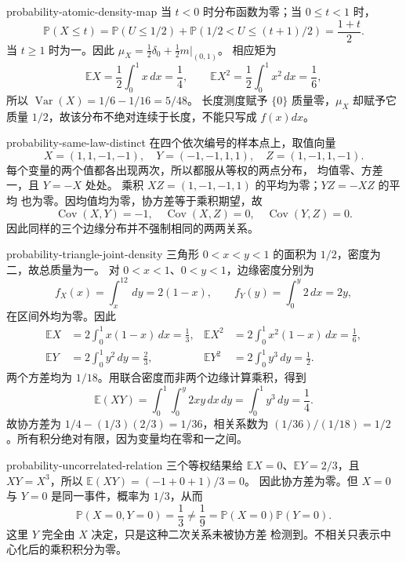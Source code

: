 \begin{solution}{probability-atomic-density-map}
当 \(t<0\) 时分布函数为零；当 \(0\le t<1\) 时，
\[
 \mathbb P(X\le t)=\mathbb P(U\le1/2)
       +\mathbb P(1/2<U\le(t+1)/2)=\frac{1+t}{2}.
\]
当 \(t\ge1\) 时为一。因此
\(\mu_X=\tfrac12\delta_0+\tfrac12m|_{(0,1)}\)。
相应矩为
\[
 \mathbb E X=\frac12\int_0^1x\,dx=\frac14,
 \qquad\mathbb E X^2=\frac12\int_0^1x^2\,dx=\frac16,
\]
所以 \(\operatorname{Var}(X)=1/6-1/16=5/48\)。
长度测度赋予 \(\{0\}\) 质量零，\(\mu_X\) 却赋予它质量
\(1/2\)，故该分布不绝对连续于长度，不能只写成 \(f(x)dx\)。
\end{solution}

\begin{solution}{probability-same-law-distinct}
在四个依次编号的样本点上，取值向量
\[
 X=(1,1,-1,-1),\quad Y=(-1,-1,1,1),\quad Z=(1,-1,1,-1).
\]
每个变量的两个值都各出现两次，所以都服从等权的两点分布，
均值零、方差一，且 \(Y=-X\) 处处。
乘积 \(XZ=(1,-1,-1,1)\) 的平均为零；\(YZ=-XZ\) 的平均
也为零。因均值均为零，协方差等于乘积期望，故
\[
 \operatorname{Cov}(X,Y)=-1,\quad
 \operatorname{Cov}(X,Z)=0,\quad
 \operatorname{Cov}(Y,Z)=0.
\]
因此同样的三个边缘分布并不强制相同的两两关系。
\end{solution}

\begin{solution}{probability-triangle-joint-density}
三角形 \(0<x<y<1\) 的面积为 \(1/2\)，密度为二，故总质量为一。
对 \(0<x<1\)、\(0<y<1\)，边缘密度分别为
\[
 f_X(x)=\int_x^12\,dy=2(1-x),\qquad
 f_Y(y)=\int_0^y2\,dx=2y,
\]
在区间外均为零。因此
\[
 \begin{aligned}
 \mathbb E X&=2\int_0^1x(1-x)\,dx=\frac13,&
 \mathbb E X^2&=2\int_0^1x^2(1-x)\,dx=\frac16,\\
 \mathbb E Y&=2\int_0^1y^2\,dy=\frac23,&
 \mathbb E Y^2&=2\int_0^1y^3\,dy=\frac12.
 \end{aligned}
\]
两个方差均为 \(1/18\)。用联合密度而非两个边缘计算乘积，得到
\[
 \mathbb E(XY)=\int_0^1\int_0^y2xy\,dx\,dy
 =\int_0^1y^3\,dy=\frac14.
\]
故协方差为 \(1/4-(1/3)(2/3)=1/36\)，相关系数为
\((1/36)/(1/18)=1/2\)。所有积分绝对有限，因为变量均在零和一之间。
\end{solution}

\begin{solution}{probability-uncorrelated-relation}
三个等权结果给
\(\mathbb E X=0\)、\(\mathbb E Y=2/3\)，且
\(XY=X^3\)，所以 \(\mathbb E(XY)=(-1+0+1)/3=0\)。
因此协方差为零。但 \(X=0\) 与 \(Y=0\) 是同一事件，概率为
\(1/3\)，从而
\[
 \mathbb P(X=0,Y=0)=\frac13
 \ne\frac19=\mathbb P(X=0)\mathbb P(Y=0).
\]
这里 \(Y\) 完全由 \(X\) 决定，只是这种二次关系未被协方差
检测到。不相关只表示中心化后的乘积积分为零。
\end{solution}

